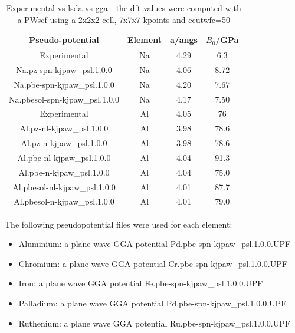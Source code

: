 \FloatBarrier 
\begin{table}[h]
\begin{center}
\renewcommand{\arraystretch}{1.2}
\begin{tabular}{c c c c}
\hline\hline
Pseudo-potential & Element & a/angs & $B_0$/GPa \\
\hline\hline
Experimental    & Na      & 4.29\cite{periodictablena} & 6.3\cite{periodictablena} \\
Na.pz-spn-kjpaw\_psl.1.0.0 & Na & 4.06 & 8.72 \\
Na.pbe-spn-kjpaw\_psl.1.0.0 & Na & 4.20 & 7.67 \\
Na.pbesol-spn-kjpaw\_psl.1.0.0 & Na & 4.17 & 7.50 \\
Experimental    & Al      & 4.05\cite{periodictableal} & 76\cite{periodictableal} \\
Al.pz-nl-kjpaw\_psl.1.0.0 & Al & 3.98 & 78.6 \\
Al.pz-n-kjpaw\_psl.1.0.0 & Al & 3.98 & 78.6 \\
Al.pbe-nl-kjpaw\_psl.1.0.0 & Al & 4.04 & 91.3 \\
Al.pbe-n-kjpaw\_psl.1.0.0 & Al & 4.04 & 75.0 \\
Al.pbesol-nl-kjpaw\_psl.1.0.0 & Al & 4.01 & 87.7 \\
Al.pbesol-n-kjpaw\_psl.1.0.0 & Al & 4.01 & 79.0 \\
\hline\hline
\end{tabular}
\end{center}
\caption{Experimental vs \acrshort{lsda} vs \acrshort{gga} - the \acrshort{dft} values were computed with a PWscf\cite{quantumespresso} using a 2x2x2 cell, 7x7x7 kpoints and ecutwfc=50}
\label{table:ggavslsdacopy}
\end{table}

\FloatBarrier 

The following pseudopotential files were used for each element:

\begin{itemize}
\item Aluminium: a plane wave GGA potential Pd.pbe-spn-kjpaw\_psl.1.0.0.UPF
\item Chromium: a plane wave GGA potential Cr.pbe-spn-kjpaw\_psl.1.0.0.UPF
\item Iron: a plane wave GGA potential Fe.pbe-spn-kjpaw\_psl.1.0.0.UPF 
\item Palladium: a plane wave GGA potential Pd.pbe-spn-kjpaw\_psl.1.0.0.UPF
\item Ruthenium: a plane wave GGA potential Ru.pbe-spn-kjpaw\_psl.1.0.0.UPF
\end{itemize}

